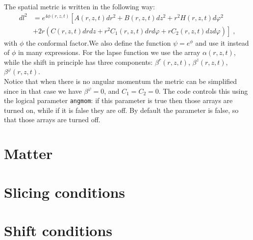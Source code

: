 \documentclass[12pt]{article}
\begin{document}
The spatial metric is written in the following way:
\begin{align}
dl^2 &= e^{4 \phi(r,z,t)} \left[ A(r,z,t) dr^2 + B(r,z,t) dz^2 
+ r^2 H(r,z,t) d\varphi^2 \right. \nonumber \\
&+ 2 \left. r \left( C(r,z,t) dr dz + r^2 C_1(r,z,t) dr d\varphi
+ r C_2(r,z,t) dz d\varphi \right) \right] \; ,
\label{eq:metric}
\end{align}
with $\phi$ the conformal factor.We also define the function $\psi =
e^\phi$ and use it instead of $\phi$ in many expressions. For the
lapse function we use the array $\alpha(r,z,t)$, while the shift in
principle has three components: $\beta^r(r,z,t)$, $\beta^z(r,z,t)$,
$\beta^\varphi(r,z,t)$. \\

Notice that when there is no angular momentum the metric can be
simplified since in that case we have $\beta^\varphi=0$, and
$C_1=C_2=0$.  The code controls this using the logical parameter
\texttt{angmom}: if this parameter is true then those arrays are
turned on, while if it is false they are off.  By default the
parameter is false, so that those arrays are turned off.





\setcounter{equation}{0}
\section{Matter}
\label{sec:matter}





\setcounter{equation}{0}
\section{Slicing conditions}
\label{sec:slicing}



\setcounter{equation}{0}
\section{Shift conditions}
\label{sec:shift}
\end{document}
